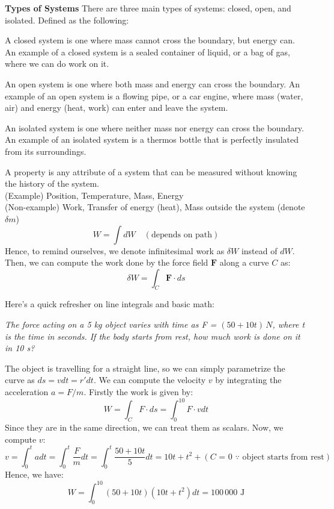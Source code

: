 \documentclass[11pt]{report}
\begin{document}
\textbf{Types of Systems} There are three main types of systems: closed, open, and isolated. Defined as the following:
\begin{definition}
    A closed system is one where mass cannot cross the boundary, but energy can. An example of a closed system is a sealed container of liquid, or a bag of gas, where we can do work on it.
\end{definition}
\begin{definition}
    An open system is one where both mass and energy can cross the boundary. An example of an open system is a flowing pipe, or a car engine, where mass (water, air) and energy (heat, work) can enter and leave the system.
\end{definition}
\begin{definition}
    An isolated system is one where neither mass nor energy can cross the boundary. An example of an isolated system is a thermos bottle that is perfectly insulated from its surroundings.
\end{definition}
\begin{definition}[Property]
    A property is any attribute of a system that can be measured without knowing the history of the system. \\
    (Example) Position, Temperature, Mass, Energy \\
    (Non-example) Work, Transfer of energy (heat), Mass outside the system (denote $\delta m$)
    \begin{equation}
        W = \int dW \quad (\text{depends on path})
    \end{equation}
    Hence, to remind ourselves, we denote infinitesimal work as $\delta W$ instead of $dW$. Then, we can compute the work done by the force field $\textbf{F}$ along a curve $C$ as:
    \begin{equation}
        \delta W = \int_C \textbf{F} \cdot ds
    \end{equation}
\end{definition}
\begin{shaded}
Here's a quick refresher on line integrals and basic math:
\begin{example}
    \textit{The force acting on a 5 kg object varies with time as F = $(50 + 10t)\,N$, where t is the time in seconds. If the body starts from rest, how much work is done on it in 10 s?}

    The object is travelling for a straight line, so we can simply parametrize the curve as $ds = v dt = r' dt$. We can compute the velocity $v$ by integrating the acceleration $a = F/m$. Firstly the work is given by:
    $$
        W = \int_{C} F \cdot ds = \int_0^{10} F \cdot v dt
    $$
    Since they are in the same direction, we can treat them as scalars. Now, we compute $v$:
    $$
        v = \int_0^t a dt = \int_0^t \frac{F}{m} dt = \int_0^t \frac{50 + 10t}{5} dt = 10t + t^2 + (\text{$C$ = 0 $\because$ object starts from rest})
    $$
    Hence, we have:
    $$
        W = \int_0^{10} (50 + 10t)(10t + t^2) dt = 100\,000 \text{ J}
    $$
\end{example}

\end{shaded}
\end{document}
